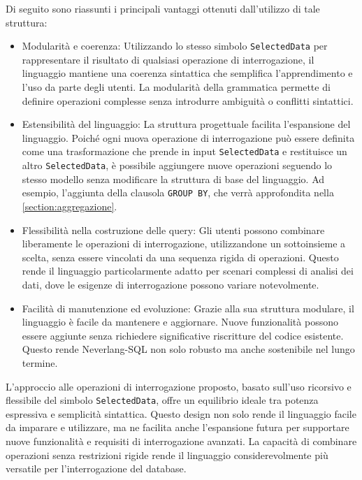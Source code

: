 \documentclass[12pt,a4paper,openright,twoside]{book}
\begin{document}
Di seguito sono riassunti i principali vantaggi ottenuti dall’utilizzo di tale struttura:
\begin{itemize}
    \item Modularità e coerenza: Utilizzando lo stesso simbolo \texttt{SelectedData} per rappresentare il risultato di qualsiasi 
    operazione di interrogazione, il linguaggio mantiene una coerenza sintattica che semplifica l’apprendimento e l’uso da parte degli 
    utenti. La modularità della grammatica permette di definire operazioni complesse senza introdurre ambiguità o conflitti sintattici.
    \item Estensibilità del linguaggio: La struttura progettuale facilita l’espansione del linguaggio. Poiché ogni nuova operazione di 
    interrogazione può essere definita come una trasformazione che prende in input \texttt{SelectedData} e restituisce un altro 
    \texttt{SelectedData}, è possibile aggiungere nuove operazioni seguendo lo stesso modello senza modificare la struttura di base del 
    linguaggio. Ad esempio, l’aggiunta della clausola \texttt{GROUP BY}, che verrà approfondita nella \cref{section:aggregazione}.
    \item Flessibilità nella costruzione delle query: Gli utenti possono combinare liberamente le operazioni di interrogazione, 
    utilizzandone un sottoinsieme a scelta, senza essere vincolati da una sequenza rigida di operazioni. Questo rende il linguaggio 
    particolarmente adatto per scenari complessi di analisi dei dati, dove le esigenze di interrogazione possono variare notevolmente.
    \item Facilità di manutenzione ed evoluzione: Grazie alla sua struttura modulare, il linguaggio è facile da mantenere e 
aggiornare. Nuove funzionalità possono essere aggiunte senza richiedere significative riscritture del codice esistente. Questo 
rende Neverlang-SQL non solo robusto ma anche sostenibile nel lungo termine.
\end{itemize}

L’approccio alle operazioni di interrogazione proposto, basato sull’uso ricorsivo e flessibile del simbolo \texttt{SelectedData}, 
offre un equilibrio ideale tra potenza espressiva e semplicità sintattica. Questo design non solo rende il linguaggio facile da 
imparare e utilizzare, ma ne facilita anche l’espansione futura per supportare nuove funzionalità e requisiti di interrogazione 
avanzati. La capacità di combinare operazioni senza restrizioni rigide rende il linguaggio considerevolmente più versatile per 
l’interrogazione del database.
\end{document}
